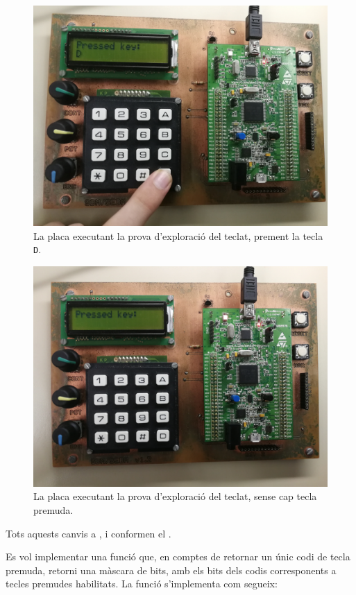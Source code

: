 \begin{figure}[p] %
  \includegraphics[width=.82\columnwidth]{../photos/board/c1-key-d}
  \caption{ \label{fig:c1-board-key-d} La placa executant la prova d'exploració del teclat, prement la tecla \texttt{D}. }
\end{figure}
\begin{figure}[p]
  \includegraphics[width=.82\columnwidth]{../photos/board/c1-key-initial}
  \caption{ \label{fig:c1-board-key-initial} La placa executant la prova d'exploració del teclat, sense cap tecla premuda. }
\end{figure}

Tots aquests canvis a ,  i 
conformen el .

\opcional
Es vol implementar una funció  que, en comptes de retornar un únic codi de tecla
premuda, retorni una màscara de bits, amb els bits dels codis corresponents a tecles premudes habilitats.
La funció s'implementa com segueix:

